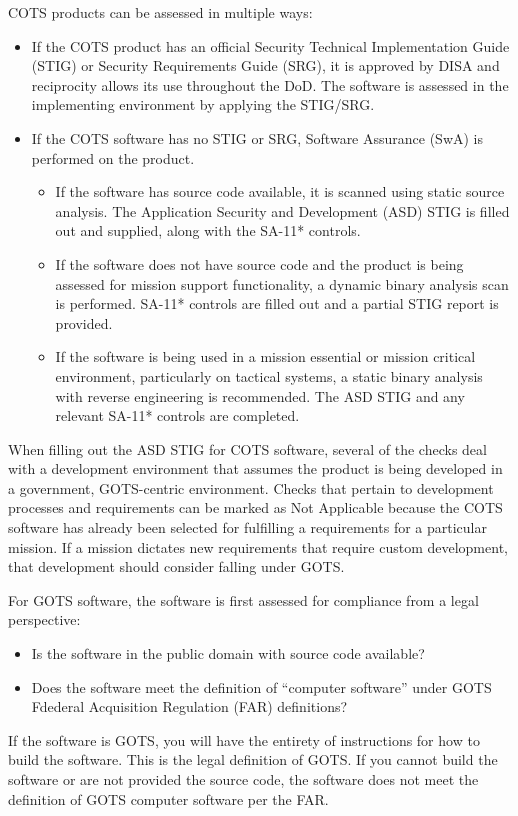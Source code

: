 COTS products can be assessed in multiple ways:
\begin{itemize}
	\item If the COTS product has an official Security Technical Implementation Guide (STIG) or Security Requirements Guide (SRG), it is approved by DISA and reciprocity allows its use throughout the DoD. The software is assessed in the implementing environment by applying the STIG/SRG.
	\item If the COTS software has no STIG or SRG, Software Assurance (SwA) is performed on the product.
	\begin{itemize}
		\item If the software has source code available, it is scanned using static source analysis. The Application Security and Development (ASD) STIG is filled out and supplied, along with the SA-11* controls.
		\item If the software does not have source code and the product is being assessed for mission support functionality, a dynamic binary analysis scan is performed. SA-11* controls are filled out and a partial STIG report is provided.
		\item If the software is being used in a mission essential or mission critical environment, particularly on tactical systems, a static binary analysis with reverse engineering is recommended. The ASD STIG and any relevant SA-11* controls are completed.
	\end{itemize}
\end{itemize}

When filling out the ASD STIG for COTS software, several of the checks deal with a development environment that assumes the product is being developed in a government, GOTS-centric environment. Checks that pertain to development processes and requirements can be marked as Not Applicable because the COTS software has already been selected for fulfilling a requirements for a particular mission. If a mission dictates new requirements that require custom development, that development should consider falling under GOTS.

For GOTS software, the software is first assessed for compliance from a legal perspective:
\begin{itemize}
	\item Is the software in the public domain with source code available?
	\item Does the software meet the definition of ``computer software'' under GOTS Fdederal Acquisition Regulation (FAR) definitions?
\end{itemize}
If the software is GOTS, you will have the entirety of instructions for how to build the software. This is the legal definition of GOTS. If you cannot build the software or are not provided the source code, the software does not meet the definition of GOTS computer software per the FAR.

